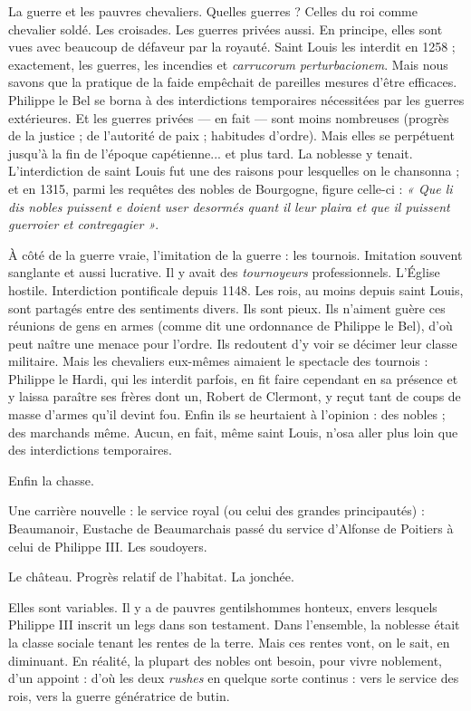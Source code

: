\documentclass[french,twoside]{book} %
\newcommand{\labelchar}[1]{{\color{rubric}\bf #1}}
\newcommand\chapterclose{} %
\renewcommand\chapterclose{} %
\begin{document}
\noindent La guerre et les pauvres chevaliers. Quelles guerres ? Celles du roi comme chevalier soldé. Les croisades. Les guerres privées aussi. En principe, elles sont vues avec beaucoup de défaveur par la royauté. Saint Louis les interdit en 1258 ; exactement, les guerres, les incendies et \emph{carrucorum perturbacionem}. Mais nous savons que la pratique de la faide empêchait de pareilles mesures d’être efficaces. Philippe le Bel se borna à des interdictions temporaires nécessitées par les guerres extérieures. Et les guerres privées — en fait — sont moins nombreuses (progrès de la justice ; de l’autorité de paix ; habitudes d’ordre). Mais elles se perpétuent jusqu’à la fin de l’époque capétienne... et plus tard. La noblesse y tenait. L’interdiction de saint Louis fut une des raisons pour lesquelles on le chansonna ; et en 1315, parmi les requêtes des nobles de Bourgogne, figure celle-ci : \emph{« Que li dis nobles puissent e doient user desormés quant il leur plaira et que il puissent guerroier et contregagier »}.\par
À côté de la guerre vraie, l’imitation de la guerre : les tournois. Imitation souvent sanglante et aussi lucrative. Il y avait des \emph{tournoyeurs} professionnels. L’Église hostile. Interdiction pontificale depuis 1148. Les rois, au moins depuis saint Louis, sont partagés entre des sentiments divers. Ils sont pieux. Ils n’aiment guère ces réunions de gens en armes (comme dit une ordonnance de Philippe le Bel), d’où peut naître une menace pour l’ordre. Ils redoutent d’y voir se décimer leur classe militaire. Mais les chevaliers eux-mêmes aimaient le spectacle des tournois : Philippe le Hardi, qui les interdit parfois, en fit faire cependant en sa présence et y laissa paraître ses frères dont un, Robert de Clermont, y reçut tant de coups de masse d’armes qu’il devint fou. Enfin ils se heurtaient à l’opinion : des nobles ; des marchands même. Aucun, en fait, même saint Louis, n’osa aller plus loin que des interdictions temporaires.\par
Enfin la chasse.\par
Une carrière nouvelle : le service royal (ou celui des grandes principautés) : Beaumanoir, Eustache de Beaumarchais passé du service d’Alfonse de Poitiers à celui de Philippe III. Les soudoyers.\par
Le château. Progrès relatif de l’habitat. La jonchée.\par
\bigbreak
\noindent \labelchar{d) Les fortunes nobiliaires.}\par
Elles sont variables. Il y a de pauvres gentilshommes honteux, envers lesquels Philippe III inscrit un legs dans son testament. Dans l’ensemble, la noblesse était la classe sociale tenant les rentes de la terre. Mais ces rentes vont, on le sait, en diminuant. En réalité, la plupart des nobles ont besoin, pour vivre noblement, d’un appoint : d’où les deux {\itshape rushes} en quelque sorte continus : vers le service des rois, vers la guerre génératrice de butin.
\chapterclose
\end{document}
